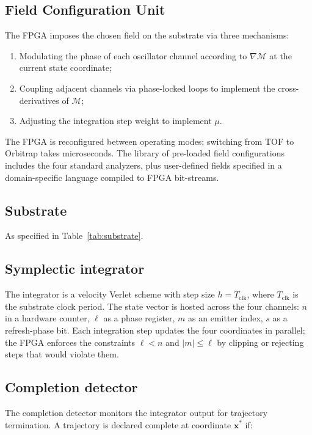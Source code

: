 \documentclass[twocolumn,11pt,a4paper]{article}
\theoremstyle{definition}
\theoremstyle{remark}
\newcommand{\Depth}{\mathcal{M}}
\newcommand{\partinert}{\mu}
\begin{document}
\subsection{Field Configuration Unit}

The FPGA imposes the chosen field on the substrate via three mechanisms:

\begin{enumerate}[nosep]
    \item Modulating the phase of each oscillator channel according to $\nabla \Depth$ at the current state coordinate;
    \item Coupling adjacent channels via phase-locked loops to implement the cross-derivatives of $\Depth$;
    \item Adjusting the integration step weight to implement $\partinert$.
\end{enumerate}

The FPGA is reconfigured between operating modes; switching from TOF to Orbitrap takes microseconds. The library of pre-loaded field configurations includes the four standard analyzers, plus user-defined fields specified in a domain-specific language compiled to FPGA bit-streams.

\subsection{Substrate}

As specified in Table~\ref{tab:substrate}.

\subsection{Symplectic integrator}

The integrator is a velocity Verlet scheme \citep{verlet1967,hairer2006} with step size $h = T_{\mathrm{clk}}$, where $T_{\mathrm{clk}}$ is the substrate clock period. The state vector is hosted across the four channels: $n$ in a hardware counter, $\ell$ as a phase register, $m$ as an emitter index, $s$ as a refresh-phase bit. Each integration step updates the four coordinates in parallel; the FPGA enforces the constraints $\ell < n$ and $|m| \le \ell$ by clipping or rejecting steps that would violate them.

\subsection{Completion detector}

The completion detector monitors the integrator output for trajectory termination. A trajectory is declared complete at coordinate $\mathbf{x}^\ast$ if:
\end{document}
